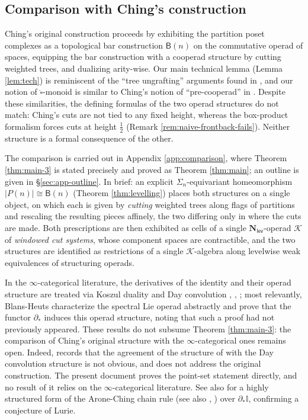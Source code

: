 \documentclass[12pt]{amsart}
\theoremstyle{definition}
\theoremstyle{remark}
\newcommand{\Id}{\mathbb{I}}
\newcommand{\boxcirc}{\mathring{\square}}
\newcommand{\Nl}{\mathbf{N}_{\mathsf{lev}}}
\newcommand{\BC}{\mathsf{B}}                     %
\newcommand{\Kop}{\mathcal{K}}                   %
\begin{document}
\subsection{Comparison with Ching's construction} \label{sec:outline-ching}
Ching's original construction \cite{Ching-thesis} proceeds by exhibiting the partition poset complexes as a topological bar construction $\BC(n)$ on the commutative operad of spaces, equipping the bar construction with a cooperad structure by cutting weighted trees, and dualizing arity-wise. Our main technical lemma (Lemma \ref{lem:tech}) is reminiscent of the ``tree ungrafting'' arguments found in \cite{Ching-thesis}, and our notion of $\boxcirc$-monoid is similar to Ching's notion of ``pre-cooperad'' in \cite{Ching-barcobar}. Despite these similarities, the defining formulas of the two operad structures do not match: Ching's cuts are not tied to any fixed height, whereas the box-product formalism forces cuts at height $\tfrac{1}{2}$ (Remark \ref{rem:naive-frontback-fails}). Neither structure is a formal consequence of the other.

The comparison is carried out in Appendix \ref{app:comparison}, where Theorem \ref{thm:main-3} is stated precisely and proved as Theorem \ref{thm:main}; an outline is given in \S\ref{sec:app-outline}. In brief: an explicit $\Sigma_n$-equivariant homeomorphism $|P(n)| \cong \BC(n)$ (Theorem \ref{thm:levelling}) places both structures on a single object, on which each is given by \textit{cutting} weighted trees along flags of partitions and rescaling the resulting pieces affinely, the two differing only in where the cuts are made. Both prescriptions are then exhibited as cells of a single $\Nl$-operad $\Kop$ of \textit{windowed cut systems}, whose component spaces are contractible, and the two structures are identified as restrictions of a single $\Kop$-algebra along levelwise weak equivalences of structuring operads. 

In the $\infty$-categorical literature, the derivatives of the identity and their operad structure are treated via Koszul duality and Day convolution \cite{Ching-day-conv}, \cite{Heuts-vn}, \cite{BR}; most relevantly, Blans-Heuts \cite{BH-charLie} characterize the spectral Lie operad abstractly and prove that the functor $\partial_*$ induces this operad structure, noting that such a proof had not previously appeared. These results do not subsume Theorem \ref{thm:main-3}: the comparison of Ching's original structure \cite{Ching-thesis} with the $\infty$-categorical ones remains open. Indeed, \cite[Example 3.3]{Ching-day-conv} records that the agreement of the structure of \cite{Ching-thesis} with the Day convolution structure is not obvious, and \cite{BH-charLie} does not address the original construction. The present document proves the point-set statement directly, and no result of it relies on the $\infty$-categorical literature. See also \cite{BB-chainrule} for a highly structured form of the Arone-Ching chain rule \cite{AC-1} (see also \cite{Klein-Rog}, \cite{Yeak}) over $\partial_*\Id$, confirming a conjecture of Lurie.
\end{document}
